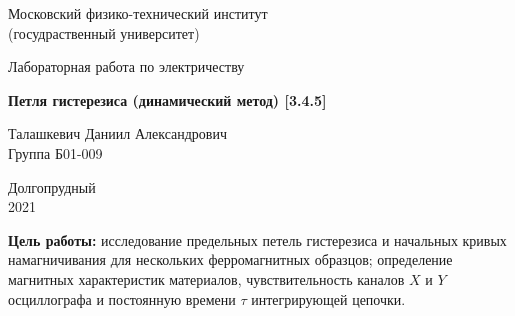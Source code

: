 \documentclass[a4paper, 12pt]{article}%
\begin{document}


\begin{titlepage}

	\newpage
	\begin{center}
		\normalsize Московский физико-технический институт \\(госудраственный 			университет)
	\end{center}

	\vspace{6em}

	\begin{center}
		\Large Лабораторная работа по электричеству\\
	\end{center}

	\vspace{1em}

	\begin{center}
		\large \textbf{Петля гистерезиса (динамический метод) [3.4.5]}
	\end{center}

	\vspace{2em}

	\begin{center}
		\large Талашкевич Даниил Александрович\\
		Группа Б01-009
	\end{center}

	\vspace{\fill}

	\begin{center}
	Долгопрудный \\2021
	\end{center}
	
\end{titlepage}



	\thispagestyle{empty}
	\newpage
	\tableofcontents
	\newpage
	\setcounter{page}{1}


					
\textbf{Цель работы:} исследование предельных петель гистерезиса и начальных кривых намагничивания для нескольких ферромагнитных образцов; определение магнитных характеристик материалов, чувствительность каналов $X$ и $Y$ осциллографа и постоянную времени $\tau$ интегрирующей цепочки.\\
\end{document}

